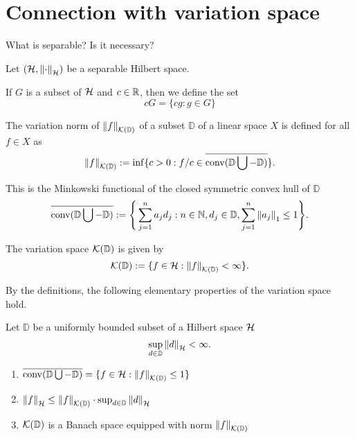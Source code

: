 \section{Connection with variation space}
\label{sec:fourier_variation_space}

What is separable? Is it necessary?

Let $(\mathcal{H}, \left\| \cdot \right\|_{\mathcal{H}})$ be a separable Hilbert space.

If $G$ is a subset of $\mathcal{H}$ and $c \in \mathbb{R}$, then we define the set
\begin{equation}
    cG = \{cg: g \in G\}
\end{equation}


\begin{definition}
    The variation norm of $\left\| {f} \right\|_{\mathcal{K}({\mathbb{D}})}$ of a subset $\mathbb{D}$ of
    a linear space $X$ is defined for all $f \in X$ as
    \begin{equation}
        \left\| {f} \right\|_{\mathcal{K}({\mathbb{D}})} := \inf \{
            c > 0: f/c \in \overline{\operatorname*{conv}(\mathbb{D} \bigcup - \mathbb{D})}
        \}.
    \end{equation}

    This is the Minkowski functional of the closed symmetric convex hull of $\mathbb{D}$
    \begin{equation}
        \overline{\operatorname*{conv}(\mathbb{D} \bigcup - \mathbb{D})} := \Bigg\{ 
            \sum_{j=1}^n a_j d_j: n \in \mathbb{N}, d_j \in \mathbb{D}, 
            \sum_{j=1}^n \left\| a_j \right\|_1 \leq 1
        \Bigg\}.
    \end{equation}
\end{definition}

\begin{definition}
    The variation space $\mathcal{K}({\mathbb{D}})$ is given by
    \begin{equation}
        \mathcal{K}({\mathbb{D}}) := \{ 
            f \in \mathcal{H}: \left\| {f} \right\|_{\mathcal{K}({\mathbb{D}})} < \infty
        \}.
    \end{equation}
\end{definition}

By the definitions, the following elementary properties of the variation space
hold.
\begin{proposition}
    \label{prop:spaceVar_properties}
    Let $\mathbb{D}$ be a uniformly bounded subset of a Hilbert space $\mathcal{H}$
    \begin{equation}
        \sup_{d\in\mathbb{D}} \left\| d \right\|_{\mathcal{H}} < \infty.
    \end{equation}
    \begin{enumerate}
        \item $\overline{\operatorname*{conv}(\mathbb{D} \bigcup - \mathbb{D})} = \{
            f\in\mathcal{H}: \left\| {f} \right\|_{\mathcal{K}({\mathbb{D}})} \leq 1
        \}$
        \item $\left\| f \right\|_{\mathcal{H}} \leq \left\| {f} \right\|_{\mathcal{K}({\mathbb{D}})} \cdot
        \sup_{d\in\mathbb{D}} \left\| d \right\|_{\mathcal{H}}$
        \item $\mathcal{K}({\mathbb{D}})$ is a Banach space equipped with norm
        $\left\| {f} \right\|_{\mathcal{K}({\mathbb{D}})}$
    \end{enumerate}
\end{proposition}


